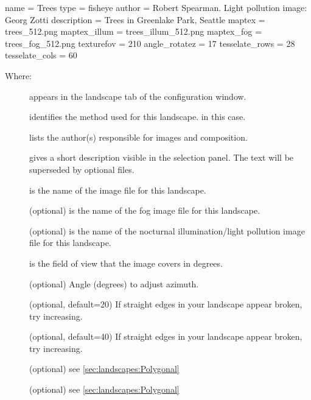 \begin{configfile}
[landscape]
name = Trees
type = fisheye
author = Robert Spearman. Light pollution image: Georg Zotti
description = Trees in Greenlake Park, Seattle
maptex = trees_512.png
maptex_illum = trees_illum_512.png
maptex_fog = trees_fog_512.png
texturefov = 210
angle_rotatez = 17
tesselate_rows = 28
tesselate_cols = 60
\end{configfile}
Where:
\begin{description}
\item[] appears in the landscape tab of the configuration window.
\item[] identifies the method used for this landscape.  in this case.
\item[] lists the author(s) responsible for images and composition.
\item[] gives a short description visible in the
  selection panel. The text will be superseded by optional
   files.
\item[] is the name of the image file for this landscape.
\item[] (optional) is the name of the fog image file for this landscape.
\item[] (optional) is the name of the nocturnal
  illumination/light pollution image file for this landscape.
\item[] is the field of view that the image covers in degrees.
\item[] (optional) Angle (degrees) to adjust azimuth.
\item[] (optional, default=20) If straight edges
  in your landscape appear broken, try increasing.
\item[] (optional, default=40) If straight edges
  in your landscape appear broken, try increasing.
\item[] (optional) see \ref{sec:landscapes:Polygonal}  %
\item[] (optional) see \ref{sec:landscapes:Polygonal} 
%

\end{description}
